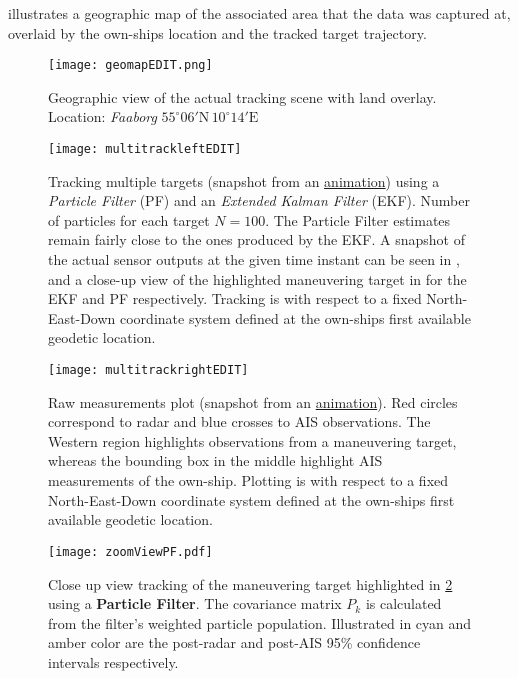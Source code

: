  illustrates a geographic map of the associated area that the data was captured at, overlaid by the own-ships location and the tracked target trajectory.


\begin{figure}[H]
	\centering
	\texttt{[image: geomapEDIT.png]}
	\caption{Geographic view of the actual tracking scene with land overlay.\\Location: \emph{Faaborg} $55^\circ 06' \text{N}  \, 10^\circ14' \text{E}$}
	\label{fig:overlay}
\end{figure}


\begin{figure}
	\centering
	\texttt{[image: multitrackleftEDIT]}
	\caption{Tracking multiple targets (snapshot from an \href{https://dimidagd.github.io/thesis/3dView_real_dataEKFandPF.gif}{animation}) using a \emph{Particle Filter} (PF) and an \emph{Extended Kalman Filter} (EKF). Number of particles for each target $N=100$. The Particle Filter estimates remain fairly close to the ones produced by the EKF. A snapshot of the actual sensor outputs at the given time instant can be seen in , and a close-up view of the highlighted maneuvering target in  for the EKF and PF respectively. Tracking is with respect to a fixed North-East-Down coordinate system defined at the own-ships first available geodetic location.}
	\label{fig:EKFandPF}
\end{figure}

\begin{figure}
	\centering
	\texttt{[image: multitrackrightEDIT]}
	\caption{Raw measurements plot (snapshot from an \href{https://dimidagd.github.io/thesis/tracking_to_referenceEKFandPF.gif}{animation}). Red circles correspond to radar and blue crosses to AIS observations. The Western region highlights observations from a maneuvering target, whereas the bounding box in the middle highlight AIS measurements of the own-ship.  Plotting is with respect to a fixed North-East-Down coordinate system defined at the own-ships first available geodetic location.}
	\label{fig:EKFandPFraw}
\end{figure}


\begin{figure}
	\centering
	\texttt{[image: zoomViewPF.pdf]}
	\caption{Close up view tracking of the maneuvering target highlighted in \cref{fig:EKFandPF} using a \textbf{Particle Filter}. The covariance matrix $P_k$ is calculated from the filter's weighted particle population. Illustrated in cyan and amber color are the post-radar and post-AIS 95\% confidence intervals respectively. }
	\label{fig:zoomviewpf}
\end{figure}


